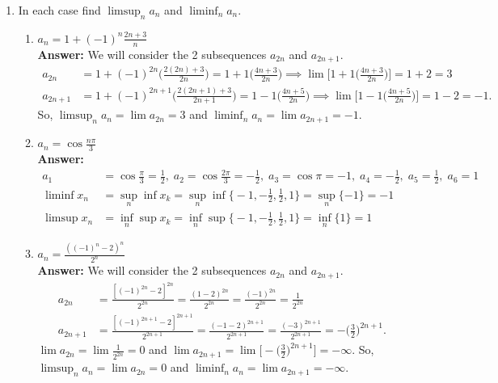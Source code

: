 \documentclass{article}
\begin{document}
\begin{enumerate}
        \item In each case find $\limsup_n a_n$ and $\liminf_n{a_n}$.
            \begin{enumerate}
            \item $a_n = 1+(-1)^n \frac{2n+3}{n}$\\
            \textbf{Answer: }We will consider the 2 subsequences $a_{2n}$ and $a_{2n+1}$.
                \begin{align*}
                    a_{2n} &= 1+(-1)^{2n}\Big(\frac{2(2n)+3}{2n}\Big) = 1+1\Big(\frac{4n+3}{2n}\Big) \implies \lim \Big[1+1\Big(\frac{4n+3}{2n}\Big)\Big] = 1+2 = 3\\
                    a_{2n+1} &= 1+(-1)^{2n+1}\Big(\frac{2(2n+1)+3}{2n+1}\Big) = 1-1\Big(\frac{4n+5}{2n}\Big) \implies \lim \Big[1-1\Big(\frac{4n+5}{2n}\Big)\Big] = 1-2 = -1.
                \end{align*}
            So, $\limsup_n{a_n} = \lim a_{2n} = 3$ and $\liminf_n{a_n} = \lim a_{2n+1} = -1$.\\
            
            \item $a_n = \cos{\frac{n\pi}{3}}$\\
            \textbf{Answer: }
                \begin{align*}
                    a_1 &= \cos{\frac{\pi}{3}} = \frac{1}{2},\; a_2 = \cos{\frac{2\pi}{3}} = -\frac{1}{2},\; a_3 = \cos{\pi} = -1,\; a_4 = -\frac{1}{2},\; a_5 = \frac{1}{2}, \; a_6 = 1\\
                    \liminf{x_n} &= \sup_n \inf{x_k} = \sup_n \inf\Big\{-1,-\frac{1}{2}, \frac{1}{2},1\Big\} = \sup_n\{-1\} = -1\\
                    \limsup{x_n} &= \inf_n \sup{x_k} = \inf_n \sup\Big\{-1,-\frac{1}{2}, \frac{1}{2},1\Big\} = \inf_n\{1\} = 1
                \end{align*}
            
            \item $a_n = \frac{((-1)^n-2)^n}{2^n}$\\
            \textbf{Answer: }We will consider the 2 subsequences $a_{2n}$ and $a_{2n+1}$.
                \begin{align*}
                    a_{2n} &= \frac{[(-1)^{2n}-2]^{2n}}{2^{2n}} = \frac{(1-2)^{2n}}{2^{2n}} = \frac{(-1)^{2n}}{2^{2n}} = \frac{1}{2^{2n}}\\
                    a_{2n+1} &= \frac{[(-1)^{2n+1}-2]^{2n+1}}{2^{2n+1}} = \frac{(-1-2)^{2n+1}}{2^{2n+1}} = \frac{(-3)^{2n+1}}{2^{2n+1}} = -\Big(\frac{3}{2}\Big)^{2n+1}.
                \end{align*}
            $\lim a_{2n} = \lim \frac{1}{2^{2n}} = 0$ and $\lim a_{2n+1} = \lim \Big[-\Big(\frac{3}{2}\Big)^{2n+1}\Big] = -\infty$. So,\\
            $\limsup_n{a_n} = \lim a_{2n} = 0$ and $\liminf_n{a_n} = \lim a_{2n+1} = -\infty$.
            \end{enumerate}
 
    \end{enumerate}
\end{document}
